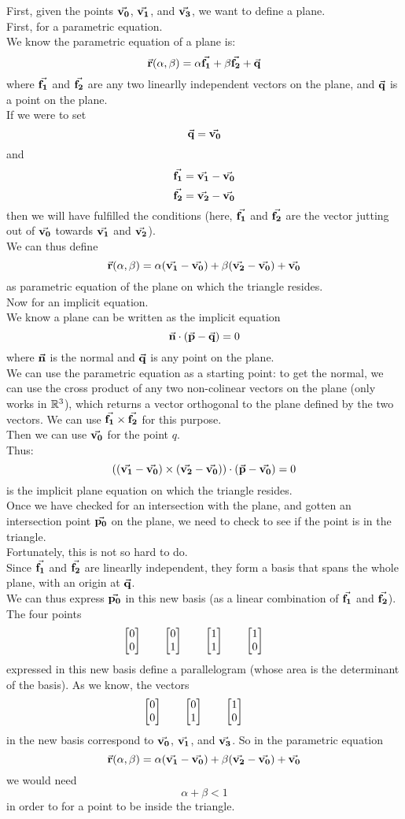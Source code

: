 \documentclass[12pt]{article}
\begin{document}
First, given the points $\vec{\mathbf{v_0}}$, $\vec{\mathbf{v_1}}$,
and $\vec{\mathbf{v_3}}$,
we want to define a plane. \\

First, for a parametric equation. \\
We know the parametric equation of a plane is:
\[ \vec{\mathbf{r}}(\alpha, \beta) 
= \alpha \vec{\mathbf{f_1}} + \beta \vec{\mathbf{f_2}} + \vec{\mathbf{q}} \]
where $\vec{\mathbf{f_1}}$ and $\vec{\mathbf{f_2}}$
are any two linearlly independent vectors
on the plane,
and $\vec{\mathbf{q}}$ is a point on the plane. \\
If we were to set
\[ \vec{\mathbf{q}} = \vec{\mathbf{v_0}} \] 
and 
\[ \vec{\mathbf{f_1}} = \vec{\mathbf{v_1}} - \vec{\mathbf{v_0}}   \]
\[ \vec{\mathbf{f_2}} = \vec{\mathbf{v_2}} - \vec{\mathbf{v_0}}   \]
then we will have fulfilled the conditions
(here, $\vec{\mathbf{f_1}}$ and $\vec{\mathbf{f_2}}$ 
are the vector jutting out of $\vec{\mathbf{v_0}}$
towards $\vec{\mathbf{v_1}}$ and $\vec{\mathbf{v_2}}$). \\
We can thus define
\[ \vec{\mathbf{r}}(\alpha, \beta) 
= \alpha (\vec{\mathbf{v_1}} - \vec{\mathbf{v_0}})
+ \beta (\vec{\mathbf{v_2}} - \vec{\mathbf{v_0}}) + \vec{\mathbf{v_0}} \]
as parametric equation of the plane
on which the triangle resides. \\

Now for an implicit equation. \\
We know a plane can be written as the implicit
equation 
\[ \vec{\mathbf{n}} \cdot (\vec{\mathbf{p}} - \vec{\mathbf{q}}) = 0 \]
where $\vec{\mathbf{n}}$ is the normal
and $\vec{\mathbf{q}}$ is any point on the plane. \\
We can use the parametric equation as a starting
point:
to get the normal, we can use the cross
product of any two non-colinear vectors
on the plane (only works in $\mathbb{R}^3$),
which returns a vector orthogonal to the plane
defined by the two vectors.
We can use $\vec{\mathbf{f_1}} \times \vec{\mathbf{f_2}}$
for this purpose. \\
Then we can use $\vec{\mathbf{v_0}}$ for the point $q$. \\
Thus:
\[ ((\vec{\mathbf{v_1}} - \vec{\mathbf{v_0}}) \times (\vec{\mathbf{v_2}} - \vec{\mathbf{v_0}}))
\cdot (\vec{\mathbf{p}} - \vec{\mathbf{v_0}}) = 0 \]
is the implicit plane equation on which the
triangle resides. \\

Once we have checked for an intersection with the
plane,
and gotten an intersection point $\vec{\mathbf{p_0}}$
on the plane,
we need to check to see if the point is in the
triangle. \\
Fortunately, this is not so hard to do. \\
Since $\vec{\mathbf{f_1}}$ and $\vec{\mathbf{f_2}}$
are linearlly independent,
they form a basis that spans the whole plane,
with an origin at $\vec{\mathbf{q}}$. \\
We can thus express $\vec{\mathbf{p_0}}$ in this
new basis (as a linear combination
of $\vec{\mathbf{f_1}}$ and $\vec{\mathbf{f_2}}$). \\
The four points
\[ \begin{bmatrix} 0 \\ 0 \end{bmatrix} \qquad
\begin{bmatrix} 0 \\ 1 \end{bmatrix} \qquad
\begin{bmatrix} 1 \\ 1 \end{bmatrix} \qquad
\begin{bmatrix} 1 \\ 0 \end{bmatrix} \qquad \]
expressed in this new basis
define a parallelogram
(whose area is the determinant of the basis).
As we know, the vectors
\[ \begin{bmatrix} 0 \\ 0 \end{bmatrix} \qquad
\begin{bmatrix} 0 \\ 1 \end{bmatrix} \qquad
\begin{bmatrix} 1 \\ 0 \end{bmatrix} \qquad \]
in the new basis correspond to
$\vec{\mathbf{v_0}}$, $\vec{\mathbf{v_1}}$, and $\vec{\mathbf{v_3}}$.
So in the parametric equation
\[ \vec{\mathbf{r}}(\alpha, \beta) 
= \alpha (\vec{\mathbf{v_1}} - \vec{\mathbf{v_0}})
+ \beta (\vec{\mathbf{v_2}} - \vec{\mathbf{v_0}}) + \vec{\mathbf{v_0}} \]
we would need
\[ \alpha + \beta < 1 \]
in order to for a point to be inside the triangle. \\
\end{document}
